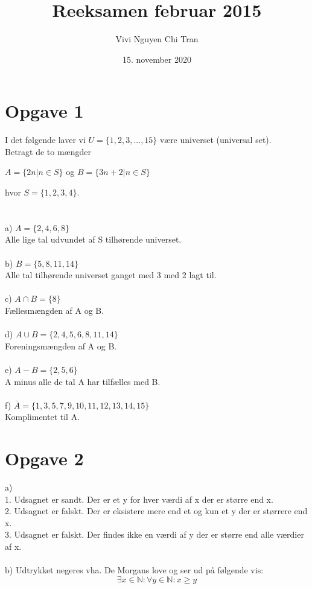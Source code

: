 \documentclass{article}
\title{Reeksamen februar 2015}
\author{Vivi Nguyen Chi Tran}
\date{15. november 2020}
\begin{document}
\maketitle
\newpage
\section*{Opgave 1}
I det følgende laver vi $U = \{1,2,3,...,15\}$ være universet (universal set).\\
Betragt de to mængder
\begin{center}
$A = \{2n | n \in S\}$ og $B = \{3n + 2 | n \in S\}  $
\end{center}
hvor $S = \{1,2,3,4\}.$\\
\\
\\
a) $A = \{2,4,6,8\}$\\
Alle lige tal udvundet af S tilhørende universet.
\\
\\
b) $B = \{5,8,11,14\}$\\
Alle tal tilhørende universet ganget med 3 med 2 lagt til.
\\
\\
c) $A \cap B = \{8\}$\\
Fællesmængden af A og B.
\\
\\
d) $A \cup B = \{2,4,5,6,8,11,14\}$\\
Foreningsmængden af A og B.
\\
\\
e) $A - B = \{2,5,6\}$\\
A minus alle de tal A har tilfælles med B.
\\
\\
f) $\bar{A} = \{1,3,5,7,9,10,11,12,13,14,15\}$ \\
Komplimentet til A.

\section*{Opgave 2}
a)
\\
1. Udsagnet er sandt. Der er et y for hver værdi af x der er større end x.
\\
2. Udsagnet er falskt. Der er eksistere mere end et og kun et y der er størrere end x.
\\
3. Udsagnet er falskt. Der findes ikke en værdi af y der er større end alle værdier af x.
\\
\\
b) Udtrykket negeres vha. De Morgans love og ser ud på følgende vis: \\
$$\exists x \in \mathbb{N}: \forall y \in \mathbb{N}: x \geq y
$$
\end{document}

